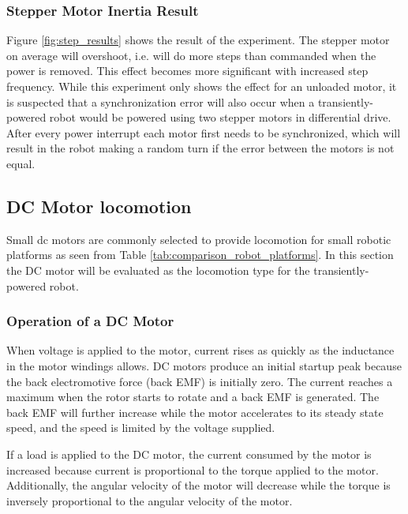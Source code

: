 

\subsubsection{Stepper Motor Inertia Result}

Figure \ref{fig:step_results} shows the result of the experiment.
The stepper motor on average will overshoot, i.e. will do more steps than commanded when the power is removed.
This effect becomes more significant with increased step frequency.
While this experiment only shows the effect for an unloaded motor, it is suspected that a synchronization error will also occur when a transiently-powered robot would be powered using two stepper motors in differential drive.
After every power interrupt each motor first needs to be synchronized, which will result in the robot making a random turn if the error between the motors is not equal.

\subsection{DC Motor locomotion}
\label{sec:pre_dc_motor_locomotion}
Small dc motors are commonly selected to provide locomotion for small robotic platforms as seen from Table \ref{tab:comparison_robot_platforms}.
In this section the DC motor will be evaluated as the locomotion type for the transiently-powered robot.

\subsubsection{Operation of a DC Motor}

When voltage is applied to the motor, current rises as quickly as the inductance in the motor windings allows.
DC motors produce an initial startup peak because the back electromotive force (back EMF) is initially zero.
The current reaches a maximum when the rotor starts to rotate and a back EMF is generated.
The back EMF will further increase while the motor accelerates to its steady state speed, and the speed is limited by the voltage supplied.

If a load is applied to the DC motor, the current consumed by the motor is increased because current is proportional to the torque applied to the motor.
Additionally, the angular velocity of the motor will decrease while the torque is inversely proportional to the angular velocity of the motor.

